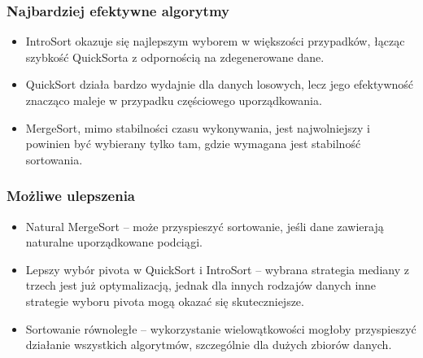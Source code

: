 \documentclass[polish,a4paper]{article}
\begin{document}
\subsubsection{Najbardziej efektywne algorytmy}
\begin{itemize}
    \item{IntroSort okazuje się najlepszym wyborem w większości przypadków, łącząc szybkość QuickSorta z odpornością na zdegenerowane dane.}
    \item{QuickSort działa bardzo wydajnie dla danych losowych, lecz jego efektywność znacząco maleje w przypadku częściowego uporządkowania.}
    \item{MergeSort, mimo stabilności czasu wykonywania, jest najwolniejszy i powinien być wybierany tylko tam, gdzie wymagana jest stabilność sortowania.}
\end{itemize}

\subsubsection{Możliwe ulepszenia}
\begin{itemize}
    \item{Natural MergeSort – może przyspieszyć sortowanie, jeśli dane zawierają naturalne uporządkowane podciągi.}
    \item{Lepszy wybór pivota w QuickSort i IntroSort – wybrana strategia mediany z trzech jest już optymalizacją, jednak dla innych rodzajów danych inne strategie wyboru pivota mogą okazać się skuteczniejsze.}
    \item{Sortowanie równoległe – wykorzystanie wielowątkowości mogłoby przyspieszyć działanie wszystkich algorytmów, szczególnie dla dużych zbiorów danych.}
\end{itemize}
\end{document}
